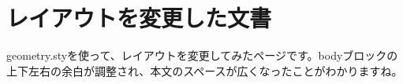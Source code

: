 \documentclass{ltjsarticle}
\begin{document}
\section{レイアウトを変更した文書}
geometry.styを使って、レイアウトを変更してみたページです。bodyブロックの上下左右の余白が調整され、本文のスペースが広くなったことがわかりますね。
\end{document}
